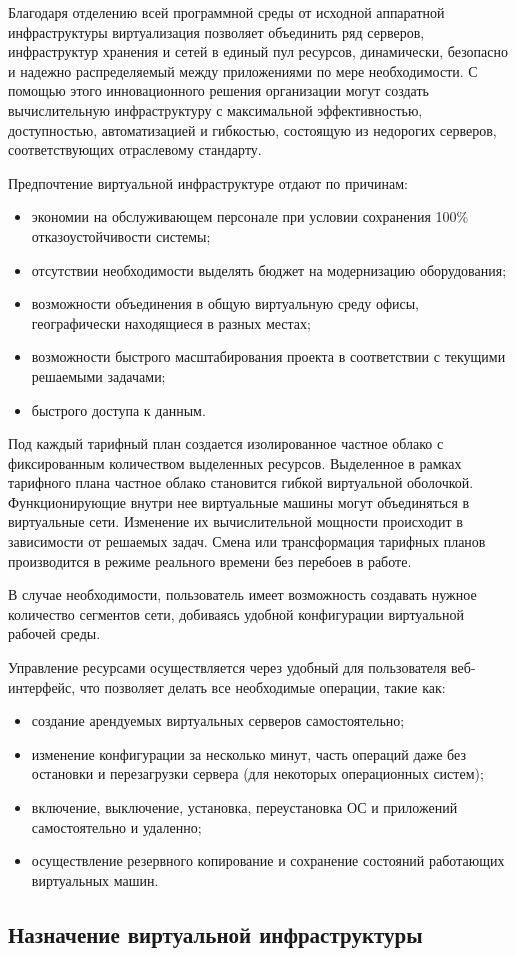 Благодаря отделению всей программной среды от исходной аппаратной инфраструктуры виртуализация позволяет объединить ряд серверов, инфраструктур хранения и сетей в единый пул ресурсов, динамически, безопасно и надежно распределяемый между приложениями по мере необходимости.
С помощью этого инновационного решения организации могут создать вычислительную инфраструктуру с максимальной эффективностью, доступностью, автоматизацией и гибкостью, состоящую из недорогих серверов, соответствующих отраслевому стандарту.

Предпочтение виртуальной инфраструктуре отдают по причинам:
\begin{itemize}
  \item экономии на обслуживающем персонале при условии сохранения 100\% отказоустойчивости системы;
  \item отсутствии необходимости выделять бюджет на модернизацию оборудования;
  \item возможности объединения в общую виртуальную среду офисы, географически находящиеся в разных местах;
  \item возможности быстрого масштабирования проекта в соответствии с текущими решаемыми задачами;
  \item быстрого доступа к данным.
\end{itemize}

Под каждый тарифный план создается изолированное частное облако с фиксированным количеством выделенных ресурсов.
Выделенное в рамках тарифного плана частное облако становится гибкой виртуальной оболочкой.
Функционирующие внутри нее виртуальные машины могут объединяться в виртуальные сети.
Изменение их вычислительной мощности происходит в зависимости от решаемых задач.
Смена или трансформация тарифных планов производится в режиме реального времени без перебоев в работе.

В случае необходимости, пользователь имеет возможность создавать нужное количество сегментов сети, добиваясь удобной конфигурации виртуальной рабочей среды.

Управление ресурсами осуществляется через удобный для пользователя веб-интерфейс, что позволяет делать все необходимые операции, такие как:
\begin{itemize}
  \item создание арендуемых виртуальных серверов самостоятельно;
  \item изменение конфигурации за несколько минут, часть операций даже без остановки и перезагрузки сервера (для некоторых операционных систем);
  \item включение, выключение, установка, переустановка ОС и приложений самостоятельно и удаленно;
  \item осуществление резервного копирование и сохранение состояний работающих виртуальных машин. 
\end{itemize}

\subsection{Назначение виртуальной инфраструктуры}

\clearpage

